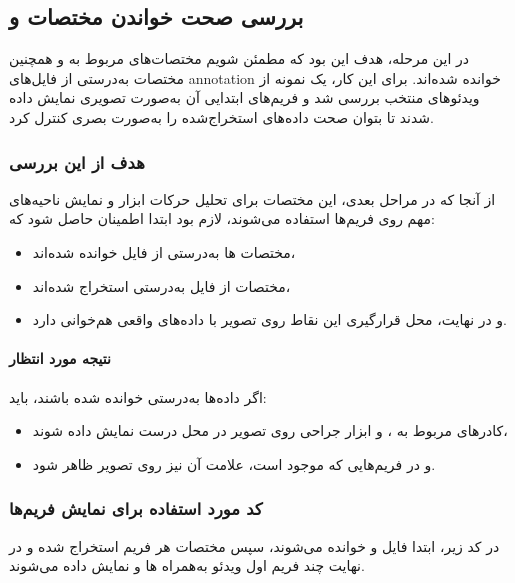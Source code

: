 \documentclass{article}
\begin{document}
\subsection{بررسی صحت خواندن مختصات  و }

در این مرحله، هدف این بود که مطمئن شویم مختصات‌های مربوط به  و همچنین مختصات  به‌درستی از فایل‌های annotation خوانده شده‌اند. برای این کار، یک نمونه از ویدئوهای منتخب بررسی شد و فریم‌های ابتدایی آن به‌صورت تصویری نمایش داده شدند تا بتوان صحت داده‌های استخراج‌شده را به‌صورت بصری کنترل کرد.

\subsubsection{هدف از این بررسی}

از آنجا که در مراحل بعدی، این مختصات برای تحلیل حرکات ابزار و نمایش ناحیه‌های مهم روی فریم‌ها استفاده می‌شوند، لازم بود ابتدا اطمینان حاصل شود که:
\begin{itemize}
	\item مختصات ‌ها به‌درستی از فایل  خوانده شده‌اند،
	\item مختصات  از فایل  به‌درستی استخراج شده‌اند،
	\item و در نهایت، محل قرارگیری این نقاط روی تصویر با داده‌های واقعی هم‌خوانی دارد.
\end{itemize}

\paragraph{نتیجه مورد انتظار}

اگر داده‌ها به‌درستی خوانده شده باشند، باید:
\begin{itemize}
	\item کادرهای مربوط به ،  و ابزار جراحی روی تصویر در محل درست نمایش داده شوند،
	\item و در فریم‌هایی که  موجود است، علامت آن نیز روی تصویر ظاهر شود.
\end{itemize}

\subsubsection{کد مورد استفاده برای نمایش فریم‌ها}

در کد زیر، ابتدا فایل  و  خوانده می‌شوند، سپس مختصات هر فریم استخراج شده و در نهایت چند فریم اول ویدئو به‌همراه ‌ها و  نمایش داده می‌شوند.
\end{document}
